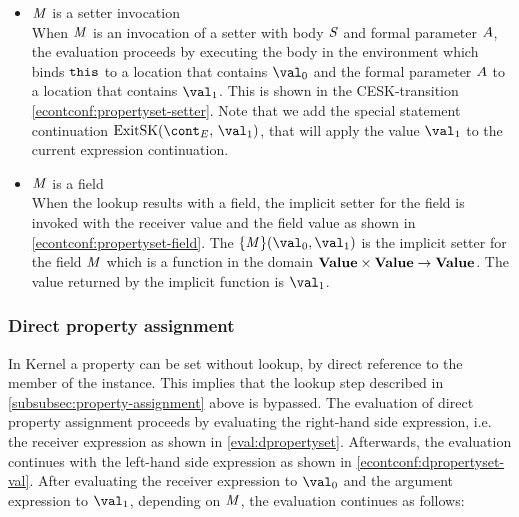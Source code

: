 \documentclass[a4paper,oneside]{article}
\begin{document}
\begin{itemize}
    \item $\mathit{M}$ is a setter invocation\\
        When $\mathit{M}$ is an invocation of a setter with body $\mathit{S}$ and formal parameter $A$, the evaluation proceeds by executing the body in the environment which binds $\tt{this}$ to a location that contains $\val_0$ and the formal parameter $A$ to a location that contains $\val_1$.
        This is shown in the CESK-transition \eqref{econtconf:propertyset-setter}.
        Note that we add the special statement continuation $\ExitSK{\val_1}$, that will apply the value $\val_1$ to the current expression continuation.

    \item $\mathit{M}$ is a field\\
        When the lookup results with a field, the implicit setter for the field is invoked with the receiver value and the field value as shown in \eqref{econtconf:propertyset-field}.
        The $\{\membermeta\}(\val_0, \val_1)$ is the implicit setter for the field $\mathit{M}$ which is a function in the domain $\mathbf{Value} \times \mathbf{Value} \rightarrow \mathbf{Value}$.
        The value returned by the implicit function is $\val_1$.

\end{itemize}


\subsubsection{Direct property assignment}
\label{subsubsec:direct-property-assignment}

In Kernel a property can be set without lookup, by direct reference to the member of the instance.
This implies that the lookup step described in \ref{subsubsec:property-assignment} above is bypassed.
The evaluation of direct property assignment proceeds by evaluating the right-hand side expression, i.e. the receiver expression as shown in \eqref{eval:dpropertyset}.
Afterwards, the evaluation continues with the left-hand side expression as shown in \eqref{econtconf:dpropertyset-val}.
After evaluating the receiver expression to $\val_0$ and the argument expression to $\val_1$, depending on $\mathit{M}$, the evaluation continues as follows:
\end{document}
